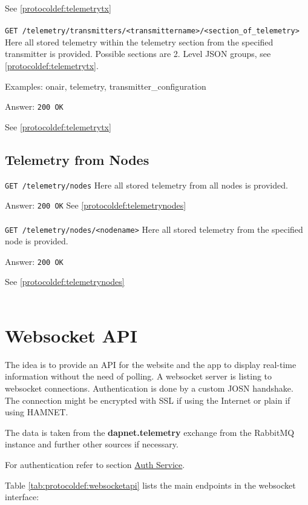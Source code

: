 See \ref{protocoldef:telemetrytx}\\\\

\texttt{GET /telemetry/transmitters/<transmittername>/<section\_of\_telemetry>}
Here all stored telemetry within the telemetry section from the specified transmitter is provided. Possible sections are 2. Level JSON groups, see \ref{protocoldef:telemetrytx}.

Examples: onair, telemetry, transmitter\_configuration

Answer:
\texttt{200 OK}

See \ref{protocoldef:telemetrytx}

\subsection{Telemetry from Nodes}

\texttt{GET /telemetry/nodes}
Here all stored telemetry from all nodes is provided.

Answer:
\texttt{200 OK}
See \ref{protocoldef:telemetrynodes}\\\\

\texttt{GET /telemetry/nodes/<nodename>}
Here all stored telemetry from the specified node is provided.

Answer:
\texttt{200 OK}

See \ref{protocoldef:telemetrynodes}\\\\


\section{Websocket API}
\label{protocoldef:websocketapi}
The idea is to provide an API for the website and the app to display real-time
information without the need of polling. A websocket server is listing to
websocket connections. Authentication is done by a custom JOSN handshake. The
connection might be encrypted with SSL if using the Internet or plain if using
HAMNET.

The data is taken from the \textbf{dapnet.telemetry} exchange
from the RabbitMQ instance and further other sources if necessary.

For authentication refer to section \hyperref[protocoldef:Auth]{Auth Service}.

Table \ref{tab:protocoldef:websocketapi} lists the main endpoints in the websocket interface:

